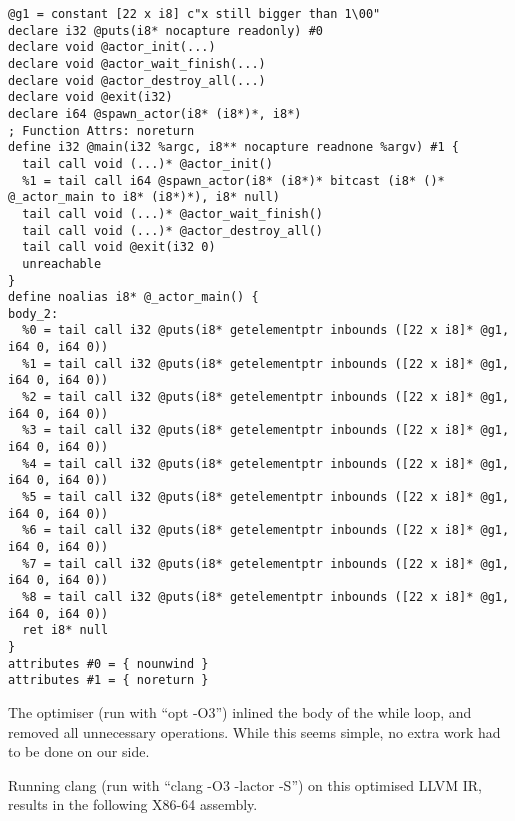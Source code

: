 \begin{verbatim}
@g1 = constant [22 x i8] c"x still bigger than 1\00"
declare i32 @puts(i8* nocapture readonly) #0
declare void @actor_init(...)
declare void @actor_wait_finish(...)
declare void @actor_destroy_all(...)
declare void @exit(i32)
declare i64 @spawn_actor(i8* (i8*)*, i8*)
; Function Attrs: noreturn
define i32 @main(i32 %argc, i8** nocapture readnone %argv) #1 {
  tail call void (...)* @actor_init()
  %1 = tail call i64 @spawn_actor(i8* (i8*)* bitcast (i8* ()* @_actor_main to i8* (i8*)*), i8* null)
  tail call void (...)* @actor_wait_finish()
  tail call void (...)* @actor_destroy_all()
  tail call void @exit(i32 0)
  unreachable
}
define noalias i8* @_actor_main() {
body_2:
  %0 = tail call i32 @puts(i8* getelementptr inbounds ([22 x i8]* @g1, i64 0, i64 0))
  %1 = tail call i32 @puts(i8* getelementptr inbounds ([22 x i8]* @g1, i64 0, i64 0))
  %2 = tail call i32 @puts(i8* getelementptr inbounds ([22 x i8]* @g1, i64 0, i64 0))
  %3 = tail call i32 @puts(i8* getelementptr inbounds ([22 x i8]* @g1, i64 0, i64 0))
  %4 = tail call i32 @puts(i8* getelementptr inbounds ([22 x i8]* @g1, i64 0, i64 0))
  %5 = tail call i32 @puts(i8* getelementptr inbounds ([22 x i8]* @g1, i64 0, i64 0))
  %6 = tail call i32 @puts(i8* getelementptr inbounds ([22 x i8]* @g1, i64 0, i64 0))
  %7 = tail call i32 @puts(i8* getelementptr inbounds ([22 x i8]* @g1, i64 0, i64 0))
  %8 = tail call i32 @puts(i8* getelementptr inbounds ([22 x i8]* @g1, i64 0, i64 0))
  ret i8* null
}
attributes #0 = { nounwind }
attributes #1 = { noreturn }
\end{verbatim}

The optimiser (run with \enquote{opt -O3}) inlined the body of the while loop, and removed all unnecessary operations. While this seems simple, no extra work had to be done on our side. 

Running clang (run with \enquote{clang -O3 -lactor -S}) on this optimised LLVM IR, results in the following X86-64 assembly.

